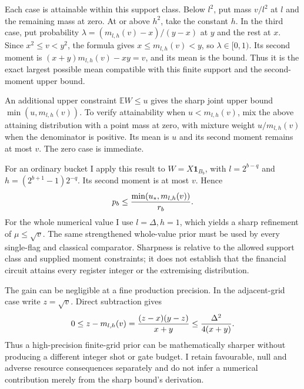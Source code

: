 Each case is attainable within this support class. Below \(l^2\), put mass \(v/l^2\) at \(l\) and the remaining mass at zero. At or above \(h^2\), take the constant \(h\). In the third case, put probability
\(\lambda=(m_{l,h}(v)-x)/(y-x)\) at \(y\) and the rest at \(x\). Since \(x^2\leq v<y^2\), the formula gives \(x\leq m_{l,h}(v)<y\), so \(\lambda\in[0,1)\). Its second moment is
\((x+y)m_{l,h}(v)-xy=v\), and its mean is the bound. Thus it is the exact largest possible mean compatible with this finite support and the second-moment upper bound.

An additional upper constraint \(\mathbb EW\leq u\) gives the sharp joint upper bound \(\min(u,m_{l,h}(v))\). To verify attainability when \(u<m_{l,h}(v)\), mix the above attaining distribution with a point mass at zero, with mixture weight \(u/m_{l,h}(v)\) when the denominator is positive. Its mean is \(u\) and its second moment remains at most \(v\). The zero case is immediate.

For an ordinary bucket I apply this result to \(W=X\mathbf1_{B_b}\), with
\(l=2^{b-q}\) and \(h=(2^{b+1}-1)2^{-q}\). Its second moment is at most \(v\). Hence
\[
 p_b\leq{\min(u_*,m_{l,h}(v))\over r_b}.
\]
For the whole numerical value I use \(l=\Delta,h=1\), which yields a sharp refinement of \(\mu\leq\sqrt v\). The same strengthened whole-value prior must be used by every single-flag and classical comparator. Sharpness is relative to the allowed support class and supplied moment constraints; it does not establish that the financial circuit attains every register integer or the extremising distribution.

The gain can be negligible at a fine production precision. In the adjacent-grid case write \(z=\sqrt v\). Direct subtraction gives
\[
 0\leq z-m_{l,h}(v)
 ={(z-x)(y-z)\over x+y}
 \leq{\Delta^2\over4(x+y)}.
\]
Thus a high-precision finite-grid prior can be mathematically sharper without producing a different integer shot or gate budget. I retain favourable, null and adverse resource consequences separately and do not infer a numerical contribution merely from the sharp bound's derivation.
